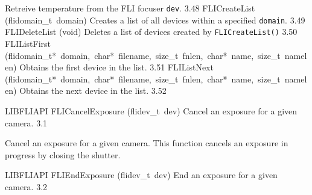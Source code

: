 \documentclass{article}
\begin{document}
\begin{cxxentry}
\begin{cxxnames}
        { Retreive temperature from the FLI focuser \texttt{dev}.}
        {3.48}
        {FLICreateList}
        {(flidomain\_t\ domain)}
        { Creates a list of all devices within a specified \texttt{domain}.}
        {3.49}
        {FLIDeleteList}
        {(void)}
        { Deletes a list of devices created by \texttt{FLICreateList()}  }
        {3.50}
        {FLIListFirst}
        {(flidomain\_t*\ domain,\ char*\ filename,\ size\_t\ fnlen,\ char*\ name,\ size\_t\ namelen)}
        { Obtains the first device in the list.}
        {3.51}
        {FLIListNext}
        {(flidomain\_t*\ domain,\ char*\ filename,\ size\_t\ fnlen,\ char*\ name,\ size\_t\ namelen)}
        { Obtains the next device in the list.}
        {3.52}
\end{cxxnames}
\begin{cxxfunction}
{LIBFLIAPI}
        {FLICancelExposure}
        {(flidev\_t\ dev)}
        { Cancel an exposure for a given camera.}
        {3.1}
\begin{cxxdoc}

Cancel an exposure for a given camera.  This function cancels an
exposure in progress by closing the shutter.


\end{cxxdoc}
\end{cxxfunction}
\begin{cxxfunction}
{LIBFLIAPI}
        {FLIEndExposure}
        {(flidev\_t\ dev)}
        { End an exposure for a given camera.}
        {3.2}
\begin{cxxdoc}


\end{cxxdoc}
\end{cxxfunction}
\end{cxxentry}
\end{document}
